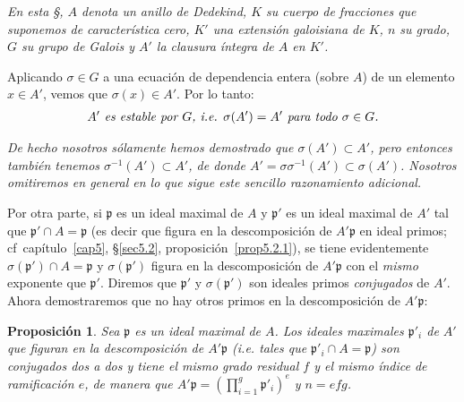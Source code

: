 \documentclass[10pt,oneside,bibtotoc,smallheadings,leqno,a5paper,DIV=12]{scrbook}
\newcommand{\idl}[1]{\mathfrak{#1}}
\numberwithin{equation}{section}
\newenvironment{comm}%
	{\begin{trivlist}\item\small\itshape}
	{\end{trivlist}}
\theoremstyle{defi}
\theoremstyle{enonce}
\newtheorem{proposition}{Proposici\'on}
\theoremstyle{rem}
\numberwithin{theorem}{section}
\numberwithin{proposition}{section}
\numberwithin{definition}{section}
\numberwithin{lemma}{section}
\numberwithin{corollary}{section}
\numberwithin{example}{section}
\numberwithin{footnote}{section}%
\begin{document}
\begin{trivlist}
\item \textit{En esta \S, $A$ denota un anillo de Dedekind, $K$ su cuerpo de fracciones que suponemos
de caracter\'istica cero, $K'$ una extensi\'on galoisiana de $K$, $n$ su grado, $G$ su grupo de Galois y
$A'$ la clausura \'integra de $A$ en $K'$.}
\end{trivlist}

Aplicando $\sigma\in G$ a una ecuaci\'on de dependencia entera (sobre $A$) de un elemento $x\in A'$, vemos
que $\sigma(x)\in A'$. Por lo tanto:
\begin{gather}\label{eq6.2.1}
\text{\itshape $A'$ es estable por $G$, i.e. $\sigma(A')=A'$ para todo $\sigma\in G$.}
\end{gather}

\begin{comm}
De hecho nosotros s\'olamente hemos demostrado que $\sigma(A')\subset A'$, pero entonces tambi\'en
tenemos $\sigma^{-1}(A')\subset A'$, de donde $A'=\sigma\sigma^{-1}(A')\subset\sigma(A')$. Nosotros
omitiremos en general en lo que sigue este sencillo razonamiento adicional.
\end{comm}

Por otra parte, si $\idl{p}$ es un ideal maximal de $A$ y $\idl{p}'$ es un ideal maximal de $A'$ tal que
$\idl{p}'\cap A=\idl{p}$ (es decir que figura en la descomposici\'on de $A'\idl{p}$ en ideal primos;
cf~cap\'itulo~\ref{cap5}, \S\ref{sec5.2}, proposici\'on~\ref{prop5.2.1}),
se tiene evidentemente $\sigma(\idl{p}')\cap A=\idl{p}$ y
$\sigma(\idl{p}')$ figura en la descomposici\'on de $A'\idl{p}$ con el {\em mismo} exponente que $\idl{p}'$.
Diremos que $\idl{p}'$ y $\sigma(\idl{p}')$ son ideales primos {\em conjugados} de $A'$. Ahora demostraremos
que no hay otros primos en la descomposici\'on de $A'\idl{p}$:

\begin{proposition}\label{prop6.2.1}
Sea $\idl{p}$ es un ideal maximal de $A$. Los ideales maximales $\idl{p}'_{i}$ de $A'$ que figuran en
la descomposici\'on de $A'\idl{p}$ (i.e. tales que $\idl{p}'_{i}\cap A=\idl{p}$) son conjugados dos a dos
y tiene el mismo grado residual $f$ y el mismo \'indice de ramificaci\'on $e$, de manera que
$A'\idl{p} = \left(\prod_{i=1}^{g}\idl{p}'_{i}\right)^{e}$ y $n=efg$.
\end{proposition}
\end{document}
